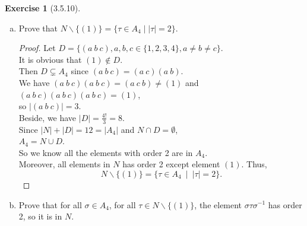 \documentclass{amsart}
\theoremstyle{plain}
\theoremstyle{definition}
\newtheorem{exer}[lem]{Exercise}
\begin{document}
\begin{exer}[3.5.10]
\begin{enumerate}[(a)]
\item 
Prove that $N\smallsetminus\{(1)\}=\{\tau\in A_4\mid|\tau|=2\}$.
\begin{proof}
  Let $D = \{(a~b~c),a,b,c \in \{1,2,3,4\}, a\neq b\neq c\}$. \\
  It is obvious that $(1) \not\in D$.\\
  Then $D \subsetneq A_4$ since $(a~b~c) = (a~c)(a~b)$.\\
  We have $(a~b~c)(a~b~c) = (a~c~b) \neq (1) $ and $(a~b~c)(a~b~c)(a~b~c) = (1)$, \\
  so $|(a~b~c)| = 3$. \\
  Beside, we have $|D| = \frac{4!}{3} = 8$. \\
  Since $|N| + |D| = 12 = |A_4|$ and $N \cap D = \emptyset $,\\
  $A_4 = N \cup D$.\\
  So we know all the elements with order 2 are in $A_4$. \\
  Moreover, all elements in $N$ has order 2 except element $(1)$.
  Thus,
  \[ N \smallsetminus \{(1)\} = \{\tau \in A_4~\mid~ |\tau| = 2\} .  \] 

\end{proof}

\item 
Prove that for all $\sigma\in A_4$, for all $\tau\in N\smallsetminus\{(1)\}$, the element $\sigma\tau\sigma^{-1}$ has order 2, so it is in $N$. 


\end{enumerate}
\end{exer}
\end{document}
